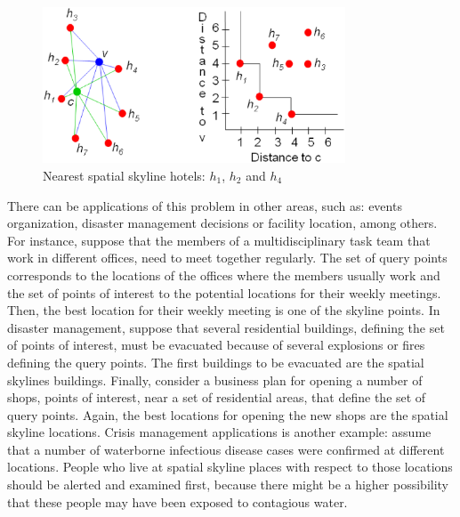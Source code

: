 \documentclass[11pt,onecolumn]{elsart3p}
\begin{document}
        \begin{figure}[!htp]
        \begin{center}

        \includegraphics[width=9cm]{img/SSQExample1.eps}
        \caption{Nearest spatial skyline hotels: $h_1$, $h_2$ and $h_4$}
        \label{fig:SDExample1}
        \end{center}
        \end{figure}


 There can be applications of this problem in other areas, such as: events organization, disaster management decisions or facility location, among others. For instance, suppose that the members of a multidisciplinary task team that work in different offices, need to meet together regularly. The set of query points corresponds to the locations of the offices where the members usually work and the set of points of interest to the potential locations for their weekly meetings. Then, the best location for their weekly meeting is one of the skyline points. In disaster management, suppose that several residential buildings, defining the set of points of interest, must be evacuated because of several explosions or fires defining the query points. The first buildings to be evacuated are the spatial skylines buildings. Finally, consider a business plan for opening a number of shops, points of interest, near a set of residential areas, that define the set of query points. Again, the best locations for opening the new shops are the spatial skyline locations. Crisis management applications is another example: assume that a number of waterborne infectious disease cases were confirmed at different locations. People who live at spatial skyline places with respect to those locations should be alerted and examined first, because there might be a higher possibility that these people may have been exposed to contagious water.
\end{document}
